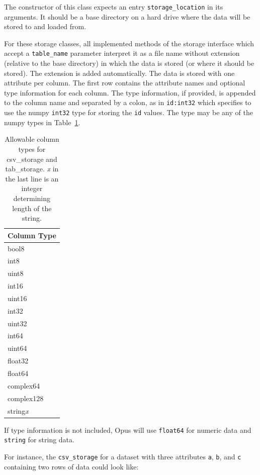 The constructor of this class expects an entry \verb|storage_location| in its
arguments. It should be a base directory on a hard drive where
the data will be stored to and loaded from.

For these storage classes, all implemented methods of the storage interface which
accept a \verb|table_name| parameter interpret it as a file name without
extension (relative to the base directory) in which the data is stored (or where
it should be stored). The extension is added automatically. The data is stored
with one attribute per column. The first row contains the attribute names and
optional type information for each column. The type information, if provided, is
appended to the column name and separated by a colon, as in \verb|id:int32| which
specifies to use the numpy \verb|int32| type for storing the \verb|id| values. 
The type may be any of the numpy types in
Table~\ref{storage-numpy-python-mapping}.


\begin{table}
\begin{center}
\begin{tabular}{|l|}\hline
Column Type \\
\hline
bool8 \\
int8 \\
uint8 \\
int16 \\
uint16 \\
int32 \\
uint32 \\
int64 \\
uint64 \\
float32 \\
float64 \\
complex64 \\
complex128 \\
string{\it x}\\
\hline
\end{tabular}
\end{center}
\caption{\label{storage-numpy-python-mapping}Allowable column types
for csv_storage and tab_storage. 
{\it x} in the last line is an integer determining length of the string.}
\end{table}

If type information is not included, Opus will use \verb|float64| for numeric data
and \verb|string| for string data.

For instance, the \verb|csv_storage| for a dataset with three attributes
\verb|a|, \verb|b|, and \verb|c| containing two rows of data could look like:

